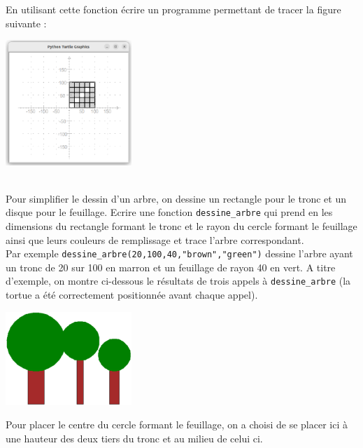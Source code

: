 \documentclass[11pt,a4paper]{article}
\begin{document}
        \item En utilisant cette fonction écrire un programme permettant de tracer la figure suivante :
        \begin{center}\includegraphics[width=180px]{ipt1-4.eps}\end{center}
    \FinListe
\FinListe

\vspace{0.2cm}

 \\
Pour simplifier le dessin d'un arbre, on dessine un rectangle pour le tronc et un disque pour le feuillage.
Ecrire une fonction {\tt dessine\_arbre} qui prend en les dimensions du rectangle formant le tronc et le rayon du cercle formant le feuillage ainsi que leurs couleurs de remplissage et trace l'arbre correspondant.\\
Par exemple {\tt dessine\_arbre(20,100,40,"brown","green")} dessine l'arbre ayant un tronc de 20 sur 100 en marron et un feuillage de rayon 40 en vert.
A titre d'exemple, on montre ci-dessous le résultats de trois appels à {\tt dessine\_arbre} (la tortue a été correctement positionnée avant chaque appel).
\begin{center}\includegraphics[width=180px]{ipt1-5.eps}\end{center}
\aide \; Pour placer le centre du cercle formant le feuillage, on a choisi de se placer ici à une hauteur des deux tiers du tronc et au milieu de celui ci.
\end{document}
